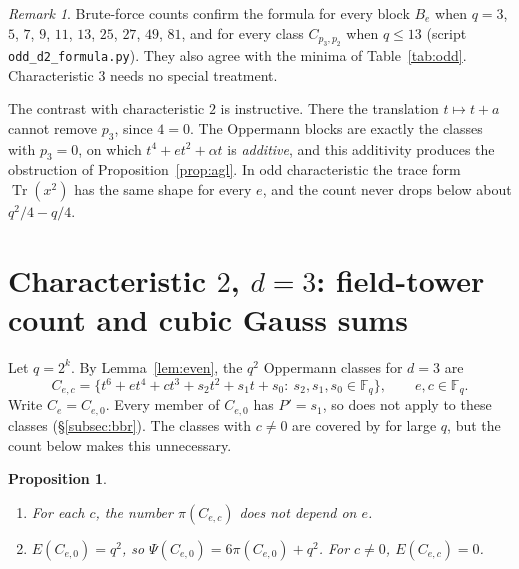 \documentclass[11pt,a4paper]{amsart}
\newtheorem{proposition}[theorem]{Proposition}
\theoremstyle{definition}
\theoremstyle{remark}
\newtheorem{remark}[theorem]{Remark}
\newcommand{\F}{\mathbb{F}}
\newcommand{\Tr}{\operatorname{Tr}}
\begin{document}
\begin{remark}
Brute-force counts confirm the formula for every block $B_e$ when
$q=3$, $5$, $7$, $9$, $11$, $13$, $25$, $27$, $49$, $81$, and for every class $C_{p_3,p_2}$ when $q\le13$ (script
\texttt{odd\_d2\_formula.py}). They also agree with the minima of Table~\ref{tab:odd}. Characteristic $3$ needs no
special treatment.

The contrast with characteristic $2$ is instructive. There the translation $t\mapsto t+a$ cannot remove $p_3$,
since $4=0$. The Oppermann blocks are exactly the classes with $p_3=0$, on which $t^4+et^2+\alpha t$ is
\emph{additive}, and this additivity produces the obstruction of Proposition~\ref{prop:agl}. In odd characteristic
the trace form $\Tr(x^2)$ has the same shape for every $e$, and the count never drops below about $q^2/4-q/4$.
\end{remark}


\section{\texorpdfstring{Characteristic $2$, $d=3$: field-tower count and cubic Gauss sums}{Characteristic 2, d=3: field-tower count and cubic Gauss sums}}\label{sec:d3}

Let $q=2^k$. By Lemma~\ref{lem:even}, the $q^2$ Oppermann classes for $d=3$ are
\[
C_{e,c}=\{t^6+et^4+ct^3+s_2t^2+s_1t+s_0:\ s_2,s_1,s_0\in\F_q\},\qquad e,c\in\F_q .
\]
Write $C_e=C_{e,0}$. Every member of $C_{e,0}$ has $P'=s_1$, so \cite{BBR} does not apply to these classes (\S\ref{subsec:bbr}). The
classes with $c\ne0$ are covered by \cite{BBR} for large $q$, but the count below makes this unnecessary.

\begin{proposition}\label{prop:p3zero}
\begin{enumerate}
\item For each $c$, the number $\pi(C_{e,c})$ does not depend on $e$.
\item $E(C_{e,0})=q^2$, so $\Psi(C_{e,0})=6\pi(C_{e,0})+q^2$. For $c\ne0$, $E(C_{e,c})=0$.
\end{enumerate}
\end{proposition}
\end{document}
